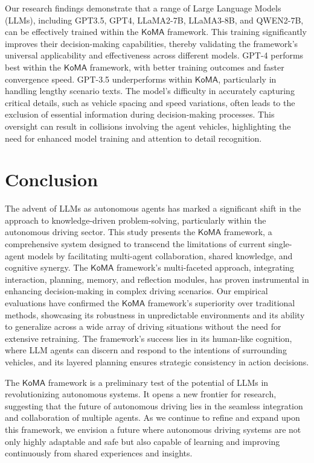 \documentclass[lettersize,journal]{IEEEtran}
\begin{document}
Our research findings demonstrate that a range of Large Language Models (LLMs), including GPT3.5\cite{brown2020language}, GPT4\cite{achiam2023gpt}, LLaMA2-7B\cite{touvron2023llama}, LLaMA3-8B\cite{Llama3}, and QWEN2-7B\cite{bai2023qwen}, can be effectively trained within the $\mathsf{KoMA}$ framework. This training significantly improves their decision-making capabilities, thereby validating the framework's universal applicability and effectiveness across different models. GPT-4 performs best within the $\mathsf{KoMA}$ framework, with better training outcomes and faster convergence speed. GPT-3.5 underperforms within $\mathsf{KoMA}$, particularly in handling lengthy scenario texts. The model's difficulty in accurately capturing critical details, such as vehicle spacing and speed variations, often leads to the exclusion of essential information during decision-making processes. This oversight can result in collisions involving the agent vehicles, highlighting the need for enhanced model training and attention to detail recognition.

\section{Conclusion}

The advent of LLMs as autonomous agents has marked a significant shift in the approach to knowledge-driven problem-solving, particularly within the autonomous driving sector. This study presents the $\mathsf{KoMA}$ framework, a comprehensive system designed to transcend the limitations of current single-agent models by facilitating multi-agent collaboration, shared knowledge, and cognitive synergy. The $\mathsf{KoMA}$ framework's multi-faceted approach, integrating interaction, planning, memory, and reflection modules, has proven instrumental in enhancing decision-making in complex driving scenarios. Our empirical evaluations have confirmed the $\mathsf{KoMA}$ framework's superiority over traditional methods, showcasing its robustness in unpredictable environments and its ability to generalize across a wide array of driving situations without the need for extensive retraining. The framework's success lies in its human-like cognition, where LLM agents can discern and respond to the intentions of surrounding vehicles, and its layered planning ensures strategic consistency in action decisions.

The $\mathsf{KoMA}$ framework is a preliminary test of the potential of LLMs in revolutionizing autonomous systems. It opens a new frontier for research, suggesting that the future of autonomous driving lies in the seamless integration and collaboration of multiple agents. As we continue to refine and expand upon this framework, we envision a future where autonomous driving systems are not only highly adaptable and safe but also capable of learning and improving continuously from shared experiences and insights.
\end{document}
